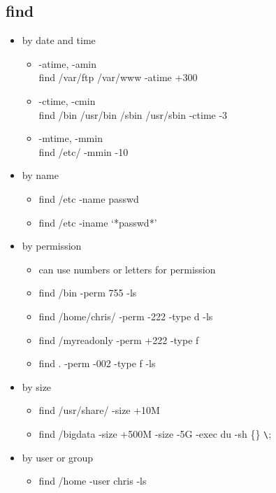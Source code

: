 \documentclass[titlepage]{article}
\begin{document}
      \subsection{find}
        \begin{itemize}
        	\item by date and time
        	  \begin{itemize}
        	  	\item -atime, -amin\\
        	  	      find /var/ftp /var/www -atime +300
        	  	\item -ctime, -cmin\\
        	  	      find /bin /usr/bin /sbin /usr/sbin -ctime -3
        	  	\item -mtime, -mmin\\
        	  	      find /etc/ -mmin -10
        	  \end{itemize}
        	\item by name
        	  \begin{itemize}
        	  	\item find /etc -name passwd
        	  	\item find /etc -iname `*passwd*'
        	  \end{itemize}
            \item by permission
              \begin{itemize}
              	\item can use numbers or letters for permission
              	\item find /bin -perm 755 -ls
              	\item find /home/chris/ -perm -222 -type d -ls
              	\item find /myreadonly -perm +222 -type f
              	\item find . -perm -002 -type f -ls
              \end{itemize}
            \item by size
              \begin{itemize}
              	\item find /usr/share/ -size +10M
              	\item find /bigdata -size +500M -size -5G -exec du -sh \{\} \verb|\|;
              \end{itemize}
            \item by user or group
              \begin{itemize}
              	\item find /home -user chris -ls

\end{itemize}
\end{itemize}
\end{document}
